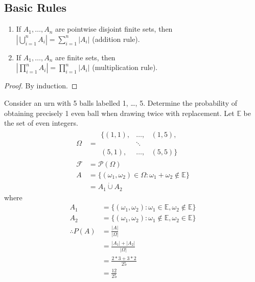\documentclass{article}
\begin{document}
	\subsection{Basic Rules}
	
	\begin{myprop}{}{}
		\begin{enumerate}
			\item If $A_1, \dots, A_n$ are pointwise disjoint finite sets, then\\
			$|\bigcup_{i=1}^{n}A_i|=\sum_{i=1}^{n}|A_i|$ (addition rule).
			\item If $A_1, \dots, A_n$ are finite sets, then\\
			$|\prod_{i=1}^{n}A_i|=\prod_{i=1}^{n}|A_i|$ (multiplication rule).
		\end{enumerate}
		
		\begin{proof}
			By induction.
		\end{proof}
	\end{myprop}
	
	\begin{myex}{}{}
		Consider an urn with 5 balls labelled 1, \dots, 5. Determine the probability of obtaining precisely 1 even ball when drawing twice with replacement. Let $\mathbb{E}$ be the set of even integers.
		\begin{align*}
			\Omega&=\begin{matrix}
				\{(1, 1), & \dots, & (1, 5),\\
				& \ddots & \\
				(5, 1), & \dots, & (5, 5)\}
				\end{matrix}\\
			\mathcal{F}&=\mathcal{P}(\Omega)\\
			A&=\{(\omega_1, \omega_2)\in\Omega : \omega_1+\omega_2\notin\mathbb{E}\}\\
			&=A_1\dot\cup A_2
		\end{align*}
		where
		\begin{align*}
			A_1&=\{(\omega_1, \omega_2) : \omega_1\in\mathbb{E}, \omega_2\notin\mathbb{E}\}\\
			A_2&=\{(\omega_1, \omega_2) : \omega_1\notin\mathbb{E}, \omega_2\in\mathbb{E}\}\\
			\therefore P(A)&=\frac{|A|}{|\Omega|}\\
			&=\frac{|A_1|+|A_2|}{|\Omega|}\\
			&=\frac{2*3+3*2}{25}\\
			&=\frac{12}{25}
		\end{align*}
	\end{myex}
	
\end{document}
